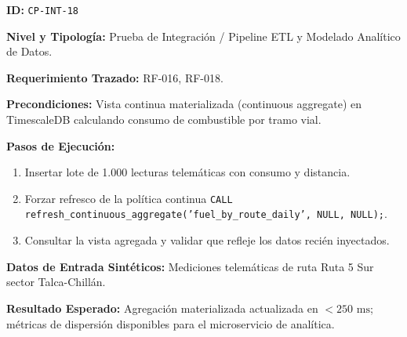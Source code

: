 \par\noindent\textbf{ID:} \texttt{C\allowbreak{}P\allowbreak{}-\allowbreak{}I\allowbreak{}N\allowbreak{}T\allowbreak{}-\allowbreak{}1\allowbreak{}8\allowbreak{}}\par
\par\noindent\textbf{Nivel y Tipología:} Prueba de Integración / Pipeline ETL y Modelado Analítico de Datos.\par
\par\noindent\textbf{Requerimiento Trazado:} RF-016, RF-018.\par
\par\noindent\textbf{Precondiciones:} Vista continua materializada (continuous aggregate) en TimescaleDB calculando consumo de combustible por tramo vial.\par
\par\noindent\textbf{Pasos de Ejecución:} \par
\begin{enumerate}
\item Insertar lote de 1.000 lecturas telemáticas con consumo y distancia.
\item Forzar refresco de la política continua \texttt{C\allowbreak{}A\allowbreak{}L\allowbreak{}L\allowbreak{} r\allowbreak{}e\allowbreak{}f\allowbreak{}r\allowbreak{}e\allowbreak{}s\allowbreak{}h\allowbreak{}\_\allowbreak{}c\allowbreak{}o\allowbreak{}n\allowbreak{}t\allowbreak{}i\allowbreak{}n\allowbreak{}u\allowbreak{}o\allowbreak{}u\allowbreak{}s\allowbreak{}\_\allowbreak{}a\allowbreak{}g\allowbreak{}g\allowbreak{}r\allowbreak{}e\allowbreak{}g\allowbreak{}a\allowbreak{}t\allowbreak{}e\allowbreak{}(\allowbreak{}'\allowbreak{}f\allowbreak{}u\allowbreak{}e\allowbreak{}l\allowbreak{}\_\allowbreak{}b\allowbreak{}y\allowbreak{}\_\allowbreak{}r\allowbreak{}o\allowbreak{}u\allowbreak{}t\allowbreak{}e\allowbreak{}\_\allowbreak{}d\allowbreak{}a\allowbreak{}i\allowbreak{}l\allowbreak{}y\allowbreak{}'\allowbreak{},\allowbreak{} N\allowbreak{}U\allowbreak{}L\allowbreak{}L\allowbreak{},\allowbreak{} N\allowbreak{}U\allowbreak{}L\allowbreak{}L\allowbreak{})\allowbreak{};\allowbreak{}}.
\item Consultar la vista agregada y validar que refleje los datos recién inyectados.
\end{enumerate}
\par\noindent\textbf{Datos de Entrada Sintéticos:} Mediciones telemáticas de ruta Ruta 5 Sur sector Talca-Chillán.\par
\par\noindent\textbf{Resultado Esperado:} Agregación materializada actualizada en \(< 250\text{ ms}\); métricas de dispersión disponibles para el microservicio de analítica.\par
